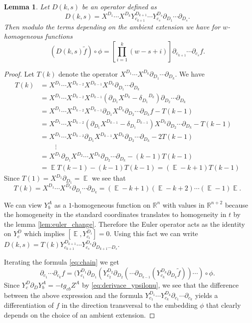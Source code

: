 \documentclass[final]{birkmult}
\newtheorem{lemma}[theorem]{Lemma}
\theoremstyle{definition}
\theoremstyle{remark}
\numberwithin{equation}{section}
\newcommand{\p}[1]{\partial_{#1}}
\DeclareMathOperator{\euler}{\mathbb{E}}
\newcommand{\di}[2]{{\delta_{#1}}^{#2}}
\begin{document}
  \begin{lemma}\label{lem:derivacni_cast}
      Let $D(k,s)$ be an operator defined as
    \[D(k,s) =X^{D_1}\cdots X^{D_k}Y_{c_{k+1}}^{D_{k+1}}\cdots Y_{c_s}^{D_s} \p{D_1} \cdots \p{D_s} .\]
    Then modulo the terms depending on the ambient extension we have for $w$-homogeneous functions
 \[(D(k,s) \tilde{f} )\circ \phi = \left[ \prod_{i=1}^{k}(w-s+i) \right] \p{c_{k+1}}\cdots \p{c_s} f.\]
  \end{lemma}
  \begin{proof}
    Let $T(k)$ denote the operator $X^{D_1}\cdots X^{D_k}\p{D_1}\cdots \p{D_k}$. We have	
    \begin{align*}
	    T(k) & = X^{D_1} \cdots X^{D_{k-2}} X^{D_{k-1}}X^{D_k}\p{D_1}\cdots \p{D_k}\\
		& = X^{D_1} \cdots X^{D_{k-2}} X^{D_{k-1}} (\p{D_1} X^{D_k} - \di{D_1}{D_k} ) \p{D_2} \cdots \p{D_k}  \\
		& = X^{D_1} \cdots X^{D_{k-2}} X^{D_{k-1}} \p{D_1} X^{D_k} \p{D_2} \cdots \p{D_k} f - T(k-1) \\
		& = X^{D_1} \cdots X^{D_{k-2}} (\p{D_1} X^{D_{k-1}} - \di{D_1}{D_{k-1}}) X^{D_k} \p{D_2} \cdots \p{D_k} - T(k-1) \\
		& = X^{D_1} \cdots X^{D_{k-2}} \p{D_1} X^{D_{k-1}} X^{D_k} \p{D_2} \cdots \p{D_k}- 2 T(k-1) \\
		& \qquad \  \vdots \\
		& = X^{D_1} \p{D_1} X^{D_2}\cdots X^{D_k} \p{D_2} \cdots \p{D_k} - (k-1) T(k-1) \\
		& = \euler T(k-1) - (k-1)T(k-1) = (\euler -k+1)T(k-1)
    \end{align*}
    Since $T(1) = X^{D_1}\p{D_1} = \euler$ we see that
    \[ T(k)= X^{D_1} \cdots X^{D_k}\p{D_1}\cdots \p{D_k}  = (\euler -k+1)(\euler - k +2)\cdots (\euler -1) \euler .\]

    We can view $Y_b^A$ as a $1$-homogeneous function on $\mathbb{R}^n$ with values in $\mathbb{R}^{n+2}$ because the homogeneity in the standard coordinates translates to homogeneity in $t$ by the lemma \eqref{lem:euler_change}. Therefore the Euler operator acts as the identity on $Y_{c}^{D}$ which implies $[\euler,Y_{c_i}^{D_i}] = 0$. Using this fact we can write 
\( D(k,s) =T(k) Y_{c_{k+1}}^{D_{k+1}}\cdots Y_{c_s}^{D_s}\p{D_{k+1} \cdots  D_s}\).

Iterating the formula \eqref{eq:chain} we get 
    \begin{equation*}
	\p{c_1} \cdots \p{c_k} f = (Y_{c_1}^{D_1}\p{D_1}(Y_{c_2}^{D_2}\p{D_2}(\cdots \p{D_{k-1}}(Y_{c_k}^{D_k}\p{D_k}\tilde{f}))\cdots)\circ\phi.
    \end{equation*}
  Since $Y_{c}^{D} \p{D}Y^A_b =  -tg_{cb}Z^A$ by  \eqref{eq:derivace_ypsilonu}, we see that the difference between the above expression and the formula $Y_{c_1}^{D_1}\cdots Y_{c_k}^{D_k} \p{c_1}\cdots\p{c_k}$ yields a differentiation of $f$ in the direction transversal to the embedding $\phi$ that clearly depends on the choice of an ambient extension.


\end{proof}
\end{document}

